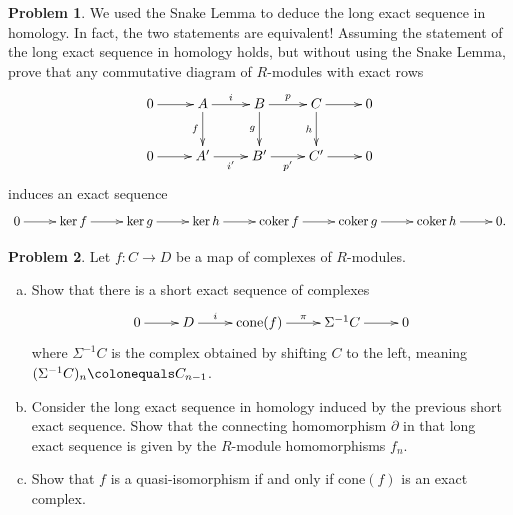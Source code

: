\documentclass[11pt]{article}
\DeclareMathOperator{\coker}{coker}
\theoremstyle{definition}
\newtheorem{problem}{Problem}
\begin{document}
\begin{problem}
	We used the Snake Lemma to deduce the long exact sequence in homology. In fact, the two statements are equivalent! Assuming the statement of the long exact sequence in homology holds, but without using the Snake Lemma, prove that any commutative diagram of $R$-modules with exact rows
	$$\xymatrix{0 \ar[r] & A \ar[d]_-f
	\ar[r]^-i & B \ar[r]^-p \ar[d]_-g & C \ar[r] \ar[d]_-h & 0 \\ 0 \ar[r] & A'
	\ar[r]_-{i'} & B' \ar[r]_-{p'} & C' \ar[r] & 0}$$
	induces an exact sequence
	$$\xymatrix{0 \ar[r] & \ker f \ar[r] & \ker g \ar[r] & \ker h \ar[r] & \coker f \ar[r] & \coker g \ar[r] & \coker h \ar[r] & 0.}$$
\end{problem}


\vspace{2em}

\noindent
{} 

\begin{problem} 
Let $f\!: C \longrightarrow D$ be a map of complexes of $R$-modules.
	\begin{enumerate}[a)]
		\item Show that there is a short exact sequence of complexes
		$$\xymatrix{0 \ar[r] & D \ar[r]^-i & \textrm{cone}(f) \ar[r]^-{\pi} & \Sigma^{-1} C \ar[r] & 0}$$
		where $\Sigma^{-1} C$ is the complex obtained by shifting $C$ to the left, meaning $(\Sigma^{-1} C)_n \colonequals C_{n-1}$.
		\item Consider the long exact sequence in homology induced by the previous short exact sequence. Show that the connecting homomorphism $\partial$ in that long exact sequence is given by the $R$-module homomorphisms $f_n$.
		\item Show that $f$ is a quasi-isomorphism if and only if $\textrm{cone}(f)$ is an exact complex.
	\end{enumerate}
\end{problem}
\end{document}
